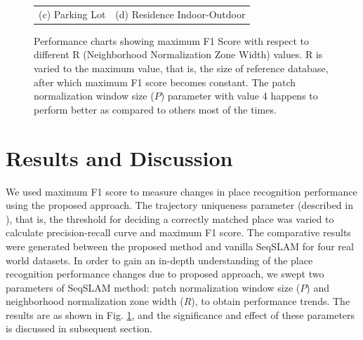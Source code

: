 \documentclass[letterpaper, 10 pt, conference]{ieeeconf}  %
\begin{document}
\begin{figure}
\begin{tabular*}{\textwidth}[t]{cc}
(c) Parking Lot & (d) Residence Indoor-Outdoor \\
 \end{tabular*}
 \caption{Performance charts showing maximum F1 Score with respect to different R (Neighborhood Normalization Zone Width) values. R is varied to the maximum value, that is, the size of reference database, after which maximum F1 score becomes constant. The patch normalization window size ($P$) parameter with value 4 happens to perform better as compared to others most of the times.}
 \label{fig:performanceChart}
\end{figure}


\section{Results and Discussion}
We used maximum F1 score to measure changes in place recognition performance using the proposed approach. The trajectory uniqueness parameter (described in \cite{Milford2012}), that is, the threshold for deciding a correctly matched place was varied to calculate precision-recall curve and maximum F1 score. The comparative results were generated between the proposed method and vanilla SeqSLAM for four real world datasets. In order to gain an in-depth understanding of the place recognition performance changes due to proposed approach, we swept two parameters of SeqSLAM method: patch normalization window size ($P$) and neighborhood normalization zone width ($R$), to obtain performance trends. The results are as shown in Fig. \ref{fig:performanceChart}, and the significance and effect of these parameters is discussed in subsequent section. 
\end{document}
